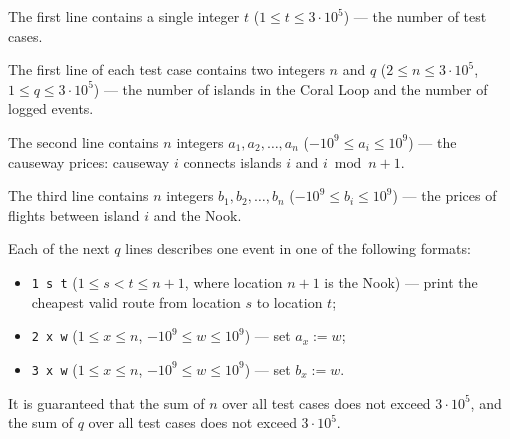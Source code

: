 The first line contains a single integer $t$ ($1 \le t \le 3 \cdot 10^5$) --- the number of test cases.

The first line of each test case contains two integers $n$ and $q$ ($2 \le n \le 3 \cdot 10^5$, $1 \le q \le 3 \cdot 10^5$) --- the number of islands in the Coral Loop and the number of logged events.

The second line contains $n$ integers $a_1, a_2, \ldots, a_n$ ($-10^9 \le a_i \le 10^9$) --- the causeway prices: causeway $i$ connects islands $i$ and $i \bmod n + 1$.

The third line contains $n$ integers $b_1, b_2, \ldots, b_n$ ($-10^9 \le b_i \le 10^9$) --- the prices of flights between island $i$ and the Nook.

Each of the next $q$ lines describes one event in one of the following formats:
\begin{itemize}
\item \texttt{1 s t} ($1 \le s < t \le n+1$, where location $n+1$ is the Nook) --- print the cheapest valid route from location $s$ to location $t$;
\item \texttt{2 x w} ($1 \le x \le n$, $-10^9 \le w \le 10^9$) --- set $a_x := w$;
\item \texttt{3 x w} ($1 \le x \le n$, $-10^9 \le w \le 10^9$) --- set $b_x := w$.
\end{itemize}

It is guaranteed that the sum of $n$ over all test cases does not exceed $3 \cdot 10^5$, and the sum of $q$ over all test cases does not exceed $3 \cdot 10^5$.

